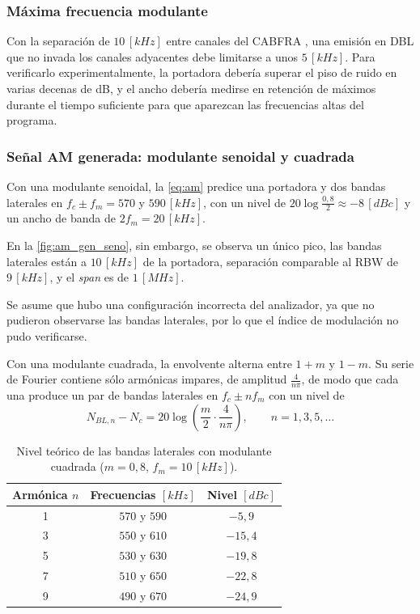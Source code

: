 \subsubsection*{Máxima frecuencia modulante}
Con la separación de $10 \, [kHz]$ entre canales del CABFRA \cite{cabfra}, una emisión en DBL que no invada los canales adyacentes debe limitarse a unos $5 \, [kHz]$. Para verificarlo experimentalmente, la portadora debería superar el piso de ruido en varias decenas de dB, y el ancho debería medirse en retención de máximos durante el tiempo suficiente para que aparezcan las frecuencias altas del programa.

\subsubsection*{Señal AM generada: modulante senoidal y cuadrada}
Con una modulante senoidal, la \autoref{eq:am} predice una portadora y dos bandas laterales en $f_c \pm f_m = 570$ y $590 \, [kHz]$, con un nivel de $20 \log \frac{0{,}8}{2} \approx -8 \, [dBc]$ y un ancho de banda de $2 f_m = 20 \, [kHz]$. 

En la \autoref{fig:am_gen_seno}, sin embargo, se observa un único pico, las bandas laterales están a $10 \, [kHz]$ de la portadora, separación comparable al RBW de $9 \, [kHz]$, y el \textit{span} es de $1 \, [MHz]$. 

Se asume que hubo una configuración incorrecta del analizador, ya que no pudieron observarse las bandas laterales, por lo que el índice de modulación no pudo verificarse.

Con una modulante cuadrada, la envolvente alterna entre $1 + m$ y $1 - m$. Su serie de Fourier contiene sólo armónicas impares, de amplitud $\frac{4}{n \pi}$, de modo que cada una produce un par de bandas laterales en $f_c \pm n f_m$ con un nivel de
\begin{equation}
    N_{BL,n} - N_c = 20 \log \left( \frac{m}{2} \cdot \frac{4}{n \pi} \right), \qquad n = 1, 3, 5, \dots
    \label{eq:am_cuadrada}
\end{equation}

\begin{table}[H]
    \centering
    \caption{Nivel teórico de las bandas laterales con modulante cuadrada ($m = 0{,}8$, $f_m = 10 \, [kHz]$).}
    \label{tab:am_cuadrada}
    \begin{tabular}{c c c}
        \toprule
        \textbf{Armónica $n$} & \textbf{Frecuencias $[kHz]$} & \textbf{Nivel $[dBc]$} \\
        \midrule
        1 & $570$ y $590$ & $-5{,}9$ \\
        3 & $550$ y $610$ & $-15{,}4$ \\
        5 & $530$ y $630$ & $-19{,}8$ \\
        7 & $510$ y $650$ & $-22{,}8$ \\
        9 & $490$ y $670$ & $-24{,}9$ \\
        \bottomrule
    \end{tabular}
\end{table}

